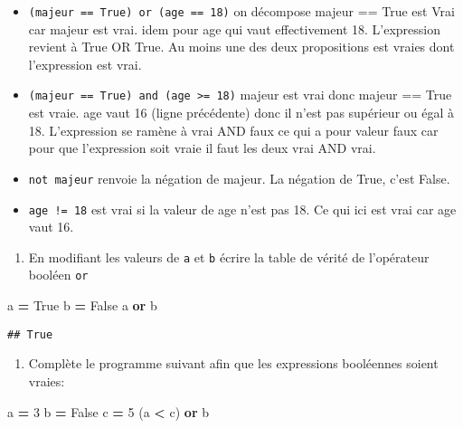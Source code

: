 \documentclass[
]{book}
\newenvironment{Shaded}{\begin{snugshade}}{\end{snugshade}}
\newcommand{\DecValTok}[1]{\textcolor[rgb]{0.00,0.00,0.81}{#1}}
\newcommand{\KeywordTok}[1]{\textcolor[rgb]{0.13,0.29,0.53}{\textbf{#1}}}
\newcommand{\NormalTok}[1]{#1}
\newcommand{\OperatorTok}[1]{\textcolor[rgb]{0.81,0.36,0.00}{\textbf{#1}}}
\newcommand{\VariableTok}[1]{\textcolor[rgb]{0.00,0.00,0.00}{#1}}
\providecommand{\tightlist}{%
  \setlength{\itemsep}{0pt}\setlength{\parskip}{0pt}}
\def\tightlist{}
\begin{document}
\begin{itemize}
\tightlist
\item
  \texttt{(majeur\ ==\ True)\ or\ (age\ ==\ 18)} on décompose majeur == True est Vrai car majeur est vrai. idem pour age qui vaut effectivement 18. L'expression revient à True OR True. Au moins une des deux propositions est vraies dont l'expression est vrai.
\item
  \texttt{(majeur\ ==\ True)\ and\ (age\ \textgreater{}=\ 18)} majeur est vrai donc majeur == True est vraie. age vaut 16 (ligne précédente) donc il n'est pas supérieur ou égal à 18. L'expression se ramène à vrai AND faux ce qui a pour valeur faux car pour que l'expression soit vraie il faut les deux vrai AND vrai.
\item
  \texttt{not\ majeur} renvoie la négation de majeur. La négation de True, c'est False.
\item
  \texttt{age\ !=\ 18} est vrai si la valeur de age n'est pas 18. Ce qui ici est vrai car age vaut 16.
\end{itemize}

\begin{enumerate}
\def\labelenumi{\arabic{enumi}.}
\setcounter{enumi}{2}
\tightlist
\item
  En modifiant les valeurs de \texttt{a} et \texttt{b} écrire la table de vérité de l'opérateur booléen \texttt{or}
\end{enumerate}

\begin{Shaded}
\begin{Highlighting}[]
\NormalTok{a }\OperatorTok{=} \VariableTok{True}
\NormalTok{b }\OperatorTok{=} \VariableTok{False}
\NormalTok{a }\KeywordTok{or}\NormalTok{ b}
\end{Highlighting}
\end{Shaded}

\begin{verbatim}
## True
\end{verbatim}

\begin{enumerate}
\def\labelenumi{\arabic{enumi}.}
\setcounter{enumi}{2}
\tightlist
\item
  Complète le programme suivant afin que les expressions booléennes soient vraies:
\end{enumerate}

\begin{Shaded}
\begin{Highlighting}[]
\NormalTok{a }\OperatorTok{=} \DecValTok{3}
\NormalTok{b }\OperatorTok{=} \VariableTok{False}
\NormalTok{c }\OperatorTok{=} \DecValTok{5}
\NormalTok{(a }\OperatorTok{\textless{}}\NormalTok{  c) }\KeywordTok{or}\NormalTok{ b}
\end{Highlighting}
\end{Shaded}
\end{document}
